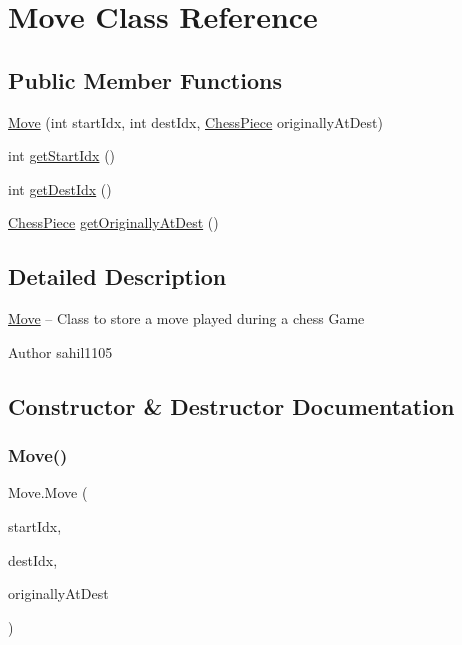 \hypertarget{class_move}{}\section{Move Class Reference}
\label{class_move}
\subsection*{Public Member Functions}
\begin{DoxyCompactItemize}
\item 
\mbox{\hyperlink{class_move_aa7f777b4644197ea7f3ca8a3ac2d1071}{Move}} (int start\+Idx, int dest\+Idx, \mbox{\hyperlink{class_chess_piece}{Chess\+Piece}} originally\+At\+Dest)
\item 
int \mbox{\hyperlink{class_move_a47bb0c813b5e27adaf266dc93598f905}{get\+Start\+Idx}} ()
\item 
int \mbox{\hyperlink{class_move_a374344305e3bdeb8c29d231d259b16d2}{get\+Dest\+Idx}} ()
\item 
\mbox{\hyperlink{class_chess_piece}{Chess\+Piece}} \mbox{\hyperlink{class_move_a75550921886fd0373de97a60a2e315c9}{get\+Originally\+At\+Dest}} ()
\end{DoxyCompactItemize}


\subsection{Detailed Description}
\mbox{\hyperlink{class_move}{Move}} -- Class to store a move played during a chess Game \begin{DoxyAuthor}{Author}
sahil1105 
\end{DoxyAuthor}


\subsection{Constructor \& Destructor Documentation}
\mbox{\label{class_move_aa7f777b4644197ea7f3ca8a3ac2d1071}} 
\subsubsection{\texorpdfstring{Move()}{Move()}}
{\footnotesize\ttfamily Move.\+Move (\begin{DoxyParamCaption}\item[{int}]{start\+Idx,  }\item[{int}]{dest\+Idx,  }\item[{\mbox{\hyperlink{class_chess_piece}{Chess\+Piece}}}]{originally\+At\+Dest }\end{DoxyParamCaption})}

